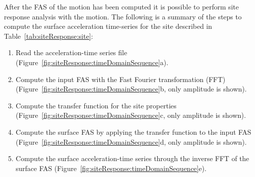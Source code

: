 \documentclass[11pt]{report}
\begin{document}
After the FAS of the motion has been computed it is possible to perform site response
analysis with the motion.  The following is a summary of the steps to compute the surface
acceleration time-series for the site described in Table~\ref{tab:siteResponse:site}:
\begin{enumerate}
  \item Read the acceleration-time series file (Figure~\ref{fig:siteResponse:timeDomainSequence}a).
  \item Compute the input FAS with the Fast Fourier transformation (FFT)
	(Figure~\ref{fig:siteResponse:timeDomainSequence}b, only amplitude is shown).
  \item Compute the transfer function for the site properties
	(Figure~\ref{fig:siteResponse:timeDomainSequence}c, only amplitude is shown).
  \item Compute the surface FAS by applying the transfer function to the input FAS
	(Figure~\ref{fig:siteResponse:timeDomainSequence}d, only amplitude is shown).
  \item Compute the surface acceleration-time series through the inverse FFT of the surface FAS
	(Figure~\ref{fig:siteResponse:timeDomainSequence}e).
\end{enumerate}
\end{document}
